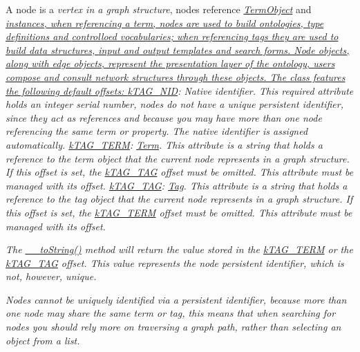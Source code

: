 A node is a {\itshape vertex in a graph structure}, nodes reference {\itshape \hyperlink{class_ontology_wrapper_1_1_term_object}{Term\-Object}} and {\itshape \hyperlink{class_ontology_wrapper_1_1_tag_object}{instances, when referencing a term, nodes are used to build {\itshape ontologies}, {\itshape type definitions} and {\itshape controlloed vocabularies}; when referencing tags they are used to build {\itshape data structures}, {\itshape input and output templates} and {\itshape search forms}. Node objects, along with edge objects, represent the presentation layer of the ontology, users compose and consult network structures through these objects. The class features the following default offsets\-: } {\ttfamily \hyperlink{}{k\-T\-A\-G\-\_\-\-N\-I\-D}}\-: {\itshape Native identifier}. This required attribute holds an {\itshape integer serial number}, nodes do not have a unique persistent identifier, since they act as references and because you may have more than one node referencing the same term or property. The native identifier is assigned automatically. {\ttfamily \hyperlink{}{k\-T\-A\-G\-\_\-\-T\-E\-R\-M}}\-: {\itshape \hyperlink{class_ontology_wrapper_1_1_term}{Term}}. This attribute is a {\itshape string} that holds a reference to the {\itshape term object} that the current node {\itshape represents in a graph structure}. If this offset is set, the \hyperlink{}{k\-T\-A\-G\-\_\-\-T\-A\-G} offset must be omitted. This attribute must be managed with its offset. {\ttfamily \hyperlink{}{k\-T\-A\-G\-\_\-\-T\-A\-G}}\-: {\itshape \hyperlink{class_ontology_wrapper_1_1_tag}{Tag}}. This attribute is a {\itshape string} that holds a reference to the {\itshape tag object} that the current node {\itshape represents in a graph structure}. If this offset is set, the \hyperlink{}{k\-T\-A\-G\-\_\-\-T\-E\-R\-M} offset must be omitted. This attribute must be managed with its offset. }

{\itshape The \hyperlink{class_ontology_wrapper_1_1_node_object_a4c43405afb19db7efd697d277e22e5f5}{\-\_\-\-\_\-to\-String()} method will return the value stored in the \hyperlink{}{k\-T\-A\-G\-\_\-\-T\-E\-R\-M} or the \hyperlink{}{k\-T\-A\-G\-\_\-\-T\-A\-G} offset. This value represents the node persistent identifier, which is not, however, unique.}

{\itshape Nodes cannot be uniquely identified via a persistent identifier, because more than one node may share the same term or tag, this means that when searching for nodes you should rely more on traversing a graph path, rather than selecting an object from a list.}


